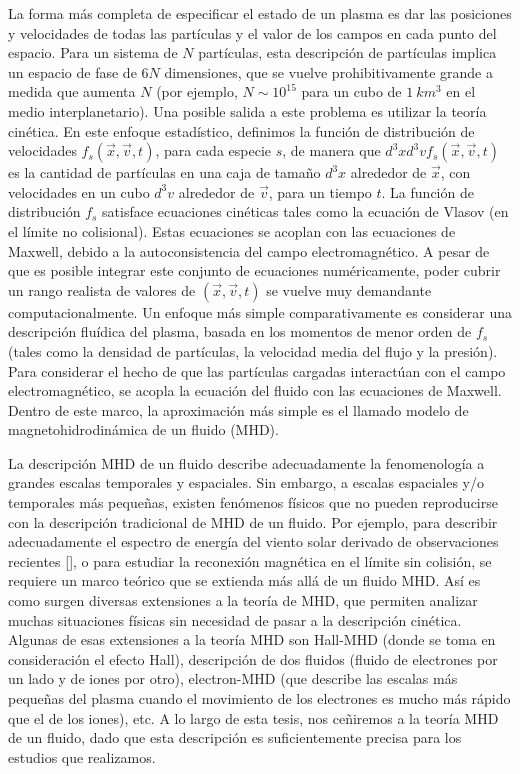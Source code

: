 La forma más completa de especificar el estado de un plasma es dar las
posiciones y velocidades de todas las partículas y el valor de los
campos en cada punto del espacio. Para un sistema de $N$ partículas,
esta descripción de partículas implica un espacio de fase de $6N$
dimensiones, que se vuelve prohibitivamente grande a medida que
aumenta $N$ (por ejemplo, $N\sim 10^{15}$ para un cubo de
$\SI{1}{km^3}$ en el medio interplanetario). Una posible salida a este
problema es utilizar la teoría cinética. En este enfoque estadístico,
definimos la función de distribución de velocidades $f_s(\vec{x},
\vec{v}, t)$, para cada especie $s$, de manera que $d^3x d^3v
f_s(\vec{x}, \vec{v}, t)$ es la cantidad de partículas en una caja de
tamaño $d^3x$ alrededor de $\vec{x}$, con velocidades en un cubo
$d^3v$ alrededor de $\vec{v}$, para un tiempo $t$. La función de
distribución $f_s$ satisface ecuaciones cinéticas tales como la
ecuación de Vlasov (en el límite no colisional). Estas ecuaciones se
acoplan con las ecuaciones de Maxwell, debido a la autoconsistencia
del campo electromagnético. A pesar de que es posible integrar este
conjunto de ecuaciones numéricamente, poder cubrir un rango realista
de valores de $(\vec{x}, \vec{v}, t)$ se vuelve muy demandante
computacionalmente. Un enfoque más simple comparativamente es
considerar una descripción fluídica del plasma, basada en los momentos
de menor orden de $f_s$ (tales como la densidad de partículas, la
velocidad media del flujo y la presión). Para considerar el hecho de
que las partículas cargadas interactúan con el campo electromagnético,
se acopla la ecuación del fluido con las ecuaciones de Maxwell. Dentro
de este marco, la aproximación más simple es el llamado modelo de
magnetohidrodinámica de un fluido (MHD).

La descripción MHD de un fluido describe adecuadamente la
fenomenología a grandes escalas temporales y espaciales.  Sin embargo,
a escalas espaciales y/o temporales más pequeñas, existen fenómenos
físicos que no pueden reproducirse con la descripción tradicional de
MHD de un fluido. Por ejemplo, para describir adecuadamente el
espectro de energía del viento solar derivado de observaciones
recientes [\cite{sahraoui_evidence_2009}], o para estudiar la reconexión
magnética en el límite sin colisión, se requiere un marco teórico que
se extienda más allá de un fluido MHD. Así es como surgen diversas
extensiones a la teoría de MHD, que permiten analizar muchas situaciones
físicas sin necesidad de pasar a la descripción cinética. Algunas de
esas extensiones a la teoría MHD son Hall-MHD (donde se toma en
consideración el efecto Hall), descripción de dos fluidos (fluido de
electrones por un lado y de iones por otro), electron-MHD (que
describe las escalas más pequeñas del plasma cuando el movimiento de
los electrones es mucho más rápido que el de los iones), etc. A lo
largo de esta tesis, nos ceñiremos a la teoría MHD de un fluido, dado
que esta descripción es suficientemente precisa para los estudios que
realizamos.


